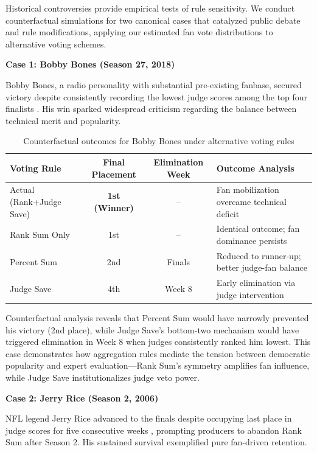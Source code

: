\documentclass{mcmthesis}
\begin{document}
Historical controversies provide empirical tests of rule sensitivity. We conduct counterfactual simulations for two canonical cases that catalyzed public debate and rule modifications, applying our estimated fan vote distributions to alternative voting schemes.

\textbf{Case 1: Bobby Bones (Season 27, 2018)}

Bobby Bones, a radio personality with substantial pre-existing fanbase, secured victory despite consistently recording the lowest judge scores among the top four finalists . His win sparked widespread criticism regarding the balance between technical merit and popularity.

\begin{table}[H]
\centering
\caption{Counterfactual outcomes for Bobby Bones under alternative voting rules}
\begin{tabular}{l c c p{5.5cm}}
\toprule
Voting Rule & Final Placement & Elimination Week & Outcome Analysis \\
\midrule
Actual (Rank+Judge Save) & \textbf{1st (Winner)} & -- & Fan mobilization overcame technical deficit \\
Rank Sum Only & 1st & -- & Identical outcome; fan dominance persists \\
Percent Sum & 2nd & Finals & Reduced to runner-up; better judge-fan balance \\
Judge Save & 4th & Week 8 & Early elimination via judge intervention \\
\bottomrule
\end{tabular}
\end{table}

Counterfactual analysis reveals that Percent Sum would have narrowly prevented his victory (2nd place), while Judge Save's bottom-two mechanism would have triggered elimination in Week 8 when judges consistently ranked him lowest. This case demonstrates how aggregation rules mediate the tension between democratic popularity and expert evaluation---Rank Sum's symmetry amplifies fan influence, while Judge Save institutionalizes judge veto power.

\textbf{Case 2: Jerry Rice (Season 2, 2006)}

NFL legend Jerry Rice advanced to the finals despite occupying last place in judge scores for five consecutive weeks , prompting producers to abandon Rank Sum after Season 2. His sustained survival exemplified pure fan-driven retention.
\end{document}
